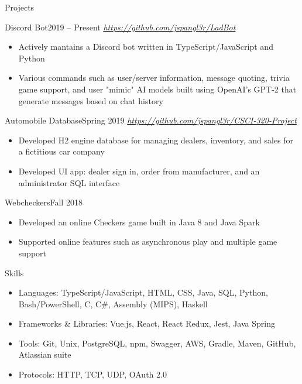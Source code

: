 \documentclass[]{mcdowellcv}
\begin{document}
	\begin{cvsection}{Projects}
		\begin{cvsubsection}{Discord Bot}{}{2019 -- Present}
			\textit{\url{https://github.com/jspangl3r/LadBot}}
			\begin{itemize}
				\item Actively mantains a Discord bot written in TypeScript/JavaScript and Python
				\item Various commands such as user/server information, message quoting, trivia game support, and user "mimic" AI models built using OpenAI's GPT-2 that generate messages based on chat history
			\end{itemize}
		\end{cvsubsection}

		\begin{cvsubsection}{Automobile Database}{}{Spring 2019}
			\textit{\url{https://github.com/jspangl3r/CSCI-320-Project}}
			\begin{itemize}
				\item Developed H2 engine database for managing dealers, inventory, and sales for a fictitious car company
				\item Developed UI app: dealer sign in, order from manufacturer, and an administrator SQL interface
			\end{itemize}
		\end{cvsubsection}

		\begin{cvsubsection}{Webcheckers}{}{Fall 2018}
			\begin{itemize}
				\item Developed an online Checkers game built in Java 8 and Java Spark
				\item Supported online features such as asynchronous play and multiple game support
			\end{itemize}
		\end{cvsubsection}
	\end{cvsection}

	\begin{cvsection}{Skills}
		\begin{cvsubsection}{}{}{}	
			\begin{itemize}
				\item Languages: TypeScript/JavaScript, HTML, CSS, Java, SQL, Python, Bash/PowerShell, C, C\#, Assembly (MIPS), Haskell
				\item Frameworks \& Libraries: Vue.js, React, React Redux, Jest, Java Spring
				\item Tools: Git, Unix, PostgreSQL, npm, Swagger, AWS, Gradle, Maven, GitHub, Atlassian suite
				\item Protocols: HTTP, TCP, UDP, OAuth 2.0
			\end{itemize}
		\end{cvsubsection}
	\end{cvsection}
	
\end{document}
